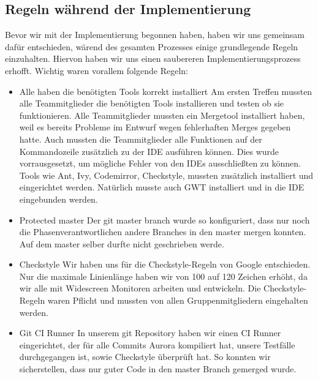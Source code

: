 \documentclass[parskip=full,11pt,twoside]{scrartcl}
\begin{document}
\subsection{Regeln während der Implementierung}
Bevor wir mit der Implementierung begonnen haben, haben wir uns gemeinsam dafür entschieden,
wärend des gesamten Prozesses einige grundlegende Regeln einzuhalten.
Hiervon haben wir uns einen saubereren Implementierungsprozess erhofft.
Wichtig waren vorallem folgende Regeln:
\begin{itemize}
	\item Alle haben die benötigten Tools korrekt installiert
	\newline
	Am ersten Treffen mussten alle Teammitglieder die benötigten Tools installieren und testen ob sie funktionieren.
	Alle Teammitglieder mussten ein Mergetool installiert haben, weil es bereits Probleme im Entwurf wegen fehlerhaften Merges gegeben hatte.
	Auch mussten die Teammitglieder alle Funktionen auf der Kommandozeile zusätzlich 	zu der IDE ausführen können. Dies wurde vorrausgesetzt, um mögliche Fehler von den IDEs ausschließten zu können.
	Tools wie Ant, Ivy, Codemirror, Checkstyle, mussten zusätzlich installiert und eingerichtet werden.
	Natürlich musste auch GWT installiert und in die IDE eingebunden werden.

    \item Protected master
        \newline
        Der git master branch wurde so konfiguriert, dass nur noch die Phasenverantwortlichen andere Branches in den master mergen konnten.
        Auf dem master selber durfte nicht geschrieben werde.
    \item Checkstyle
    \newline
    Wir haben uns für die Checkstyle-Regeln von Google entschieden. Nur die maximale Linienlänge haben wir von 100 auf 120 Zeichen erhöht, da wir alle mit Widescreen Monitoren arbeiten und entwickeln. Die Checkstyle-Regeln waren Pflicht und mussten von allen Gruppenmitgliedern eingehalten werden.
    \item Git CI Runner
        \newline
        In unserem git Repository haben wir einen CI Runner eingerichtet, der für alle Commits Aurora kompiliert hat, unsere Testfälle durchgegangen ist, sowie Checkstyle überprüft hat.
        So konnten wir sicherstellen, dass nur guter Code in den master Branch gemerged wurde.


\end{itemize}
\end{document}
